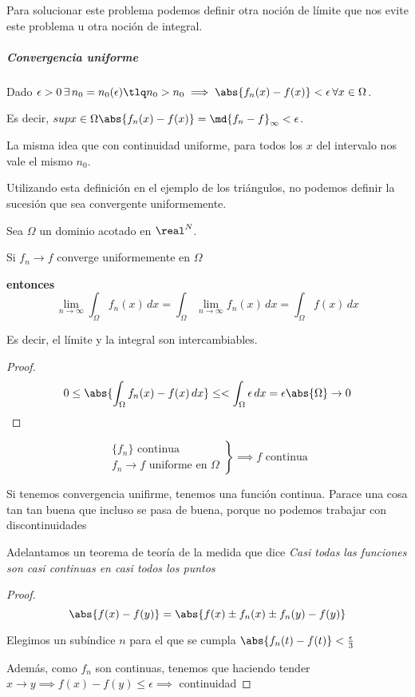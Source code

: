 Para solucionar este problema podemos definir otra noción de límite que nos evite este problema u otra noción de integral.

\subparagraph{\textit{Convergencia uniforme}}

Dado $\epsilon>0\,\exists\,n_0=n_0(\epsilon) \tlq n_0>n_0 \implies \abs{f_n(x) - f(x)} < \epsilon\, \forall x\in\Omega$.

Es decir, ${sup}{x\in\Omega} \abs{f_n(x)-f(x)} = \md{f_n-f}_{\infty} <\epsilon$.

La misma idea que con continuidad uniforme, para todos los $x$ del intervalo nos vale el mismo $n_0$.

Utilizando esta definición en el ejemplo de los triángulos, no podemos definir la sucesión que sea convergente uniformemente.

\begin{theorem}
Sea $\Omega$ un dominio acotado en $\real^N$. 

Si $f_n \to f$ converge uniformemente en $\Omega$

\textbf{entonces}
\[\lim_{n\to\infty} \int_{\Omega} f_n(x)\,dx = \int_{\Omega} \lim_{n\to\infty} f_n(x)\,dx = \int_{\Omega} f(x)\,dx\]

Es decir, el límite y la integral son intercambiables.
\end{theorem}

\begin{proof}
\[0\leq\abs{\int_{\Omega}f_n(x) - f(x) \, dx} \leq <\int_{\Omega} \epsilon \,dx =\epsilon\abs{\Omega} \to 0\]
\end{proof}

\begin{theorem}
\[\left.\begin{array}{cc}
\{f_n\} \text{ continua }\\
f_n \to f \text{ uniforme en } \Omega \end{array}
\right\} \implies f \text{ continua}\]
\end{theorem}
\obs Si tenemos convergencia unifirme, tenemos una función continua. Parace una cosa tan tan buena que incluso se pasa de buena, porque no podemos trabajar con discontinuidades

\obs Adelantamos un teorema de teoría de la medida que dice \textit{ Casi todas las funciones son casi continuas en casi todos los puntos}


\begin{proof}
\[\abs{f(x) - f(y)} = \abs{f(x) \pm f_n(x) \pm f_n(y) - f(y)}\]

Elegimos un subíndice $n$ para el que se cumpla $\abs{f_n(t) - f(t)} < \frac{\epsilon}{3}$

Además, como $f_n$ son continuas, tenemos que haciendo tender $x\to y \implies f(x) - f(y) \leq \epsilon \implies$ continuidad
\end{proof}


